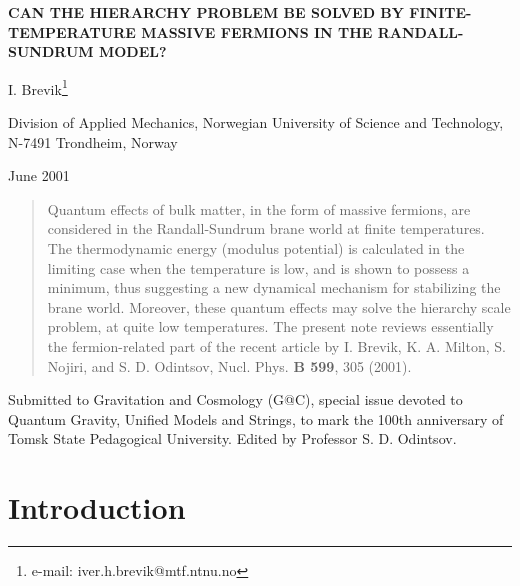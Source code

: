 \documentclass[a4paper,12pt]{article}
\begin{document}
\begin{center}


\textbf{CAN THE HIERARCHY PROBLEM BE SOLVED BY 
FINITE-TEMPERATURE  MASSIVE FERMIONS IN THE RANDALL-SUNDRUM MODEL?}

\bigskip

\bigskip

   I. Brevik\footnote{e-mail: iver.h.brevik@mtf.ntnu.no}  \\        

  \bigskip

\bigskip            

          Division of Applied Mechanics,
           Norwegian University of Science and Technology,
           N-7491 Trondheim, Norway \\           
\bigskip
\bigskip

 June 2001
\end{center} 

\bigskip        

\begin{abstract}

    Quantum effects of bulk matter, in the form of massive fermions, are considered in the Randall-Sundrum \coordHE{} brane world at finite temperatures. The thermodynamic energy (modulus potential) is calculated in the limiting case when the temperature is low, and is shown to possess a minimum, thus suggesting a new dynamical mechanism for stabilizing the brane world. Moreover, these quantum effects may solve the hierarchy scale problem, at quite low temperatures. The present note reviews essentially the fermion-related part of the recent article by I. Brevik, K. A. Milton, S. Nojiri, and S. D. Odintsov, Nucl. Phys. {\bf B 599}, 305 (2001).
\end{abstract}


\bigskip
\bigskip
\bigskip
\bigskip

Submitted to Gravitation and Cosmology (G@C), special issue devoted to Quantum Gravity, Unified Models and Strings, to mark the 100th anniversary of Tomsk State Pedagogical University. Edited by Professor S. D. Odintsov.

         

\newpage
 

\section{Introduction}
\end{document}
